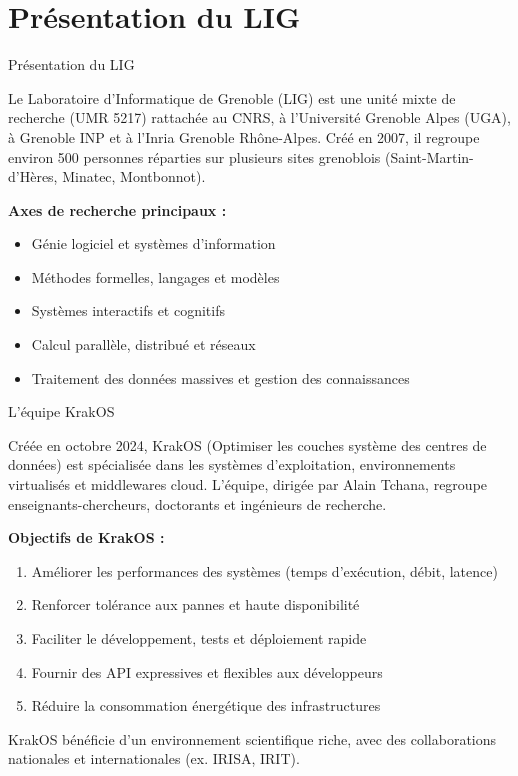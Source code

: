 \documentclass[aspectratio=43,8pt]{beamer}
\begin{document}
\section{Présentation du LIG}
\begin{frame}{Présentation du LIG}
\begin{card}
Le Laboratoire d’Informatique de Grenoble (LIG) est une unité mixte de recherche (UMR 5217) rattachée au CNRS, à l’Université Grenoble Alpes (UGA), à Grenoble INP et à l’Inria Grenoble Rhône-Alpes.  
Créé en 2007, il regroupe environ 500 personnes réparties sur plusieurs sites grenoblois (Saint-Martin-d’Hères, Minatec, Montbonnot).  

\medskip
\textbf{Axes de recherche principaux :}
\begin{itemize}
    \item Génie logiciel et systèmes d’information
    \item Méthodes formelles, langages et modèles
    \item Systèmes interactifs et cognitifs
    \item Calcul parallèle, distribué et réseaux
    \item Traitement des données massives et gestion des connaissances
\end{itemize}
\end{card}
\end{frame}

\begin{frame}{L’équipe KrakOS}
\begin{card}
Créée en octobre 2024, KrakOS (Optimiser les couches système des centres de données) est spécialisée dans les systèmes d’exploitation, environnements virtualisés et middlewares cloud.  
L’équipe, dirigée par Alain Tchana, regroupe enseignants-chercheurs, doctorants et ingénieurs de recherche.

\medskip
\textbf{Objectifs de KrakOS :}
\begin{enumerate}
    \item Améliorer les performances des systèmes (temps d’exécution, débit, latence)
    \item Renforcer tolérance aux pannes et haute disponibilité
    \item Faciliter le développement, tests et déploiement rapide
    \item Fournir des API expressives et flexibles aux développeurs
    \item Réduire la consommation énergétique des infrastructures
\end{enumerate}

\medskip
KrakOS bénéficie d’un environnement scientifique riche, avec des collaborations nationales et internationales (ex. IRISA, IRIT).
\end{card}
\end{frame}
\end{document}
